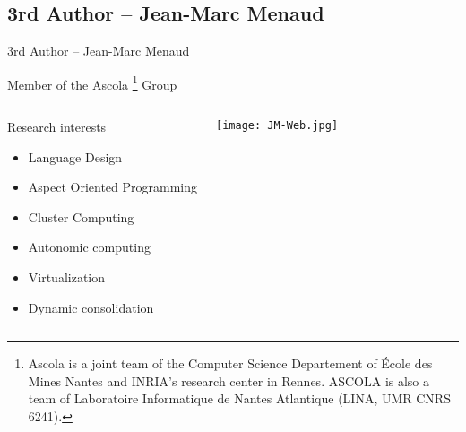 \subsection{3rd Author -- Jean-Marc Menaud} 
\begin{frame}{3rd Author -- Jean-Marc Menaud }

Member of the Ascola \footnote{Ascola is a joint team of the Computer Science 
Departement of École des Mines Nantes and INRIA's research center in Rennes. 
ASCOLA is also a team of Laboratoire Informatique de Nantes Atlantique (LINA, 
UMR CNRS 6241).} Group

\begin{columns}[t]%



\begin{block}{Research interests}
\begin{itemize}
\item<1-> Language Design
\item<2-> Aspect Oriented Programming
\item<3-> Cluster Computing
\item<4-> Autonomic computing
\item<5-> Virtualization
\item<6-> Dynamic consolidation
\end{itemize}
\end{block}


\texttt{[image: JM-Web.jpg]} 
\end{columns}
\end{frame}

